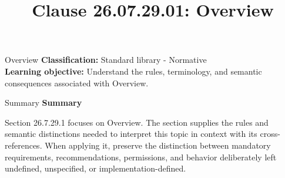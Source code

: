 \documentclass[10pt,letterpaper]{article}
\title{Clause 26.07.29.01: Overview}
\author{}
\date{}
\begin{document}
\maketitle
\begin{CornellOverviewBox}{Overview}
\textbf{Classification:} Standard library - Normative\\[2pt]
\textbf{Learning objective:} Understand the rules, terminology, and semantic consequences associated with Overview.
\end{CornellOverviewBox}\begin{CornellSummaryBox}{Summary}
{\sffamily\bfseries\color{Accent} Summary}\par\vspace{3pt}Section 26.7.29.1 focuses on Overview. The section supplies the rules and semantic distinctions needed to interpret this topic in context with its cross-references. When applying it, preserve the distinction between mandatory requirements, recommendations, permissions, and behavior deliberately left undefined, unspecified, or implementation-defined.
\end{CornellSummaryBox}
\end{document}
